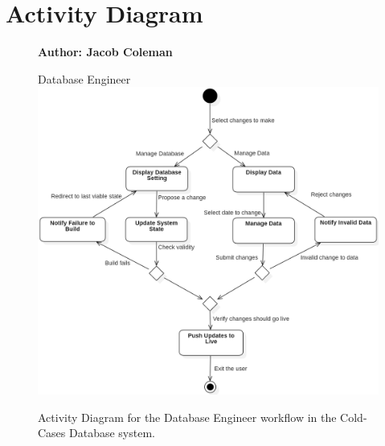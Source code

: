 \documentclass[11pt]{article}
\begin{document}
\section*{Activity Diagram}

\begin{figure}[!ht]
\centering
\textbf{Author: Jacob Coleman}
\vspace{1em}

Database Engineer
	\includegraphics[width=.95\textwidth]{./Activity Diagram/activitydiagram_jardee_1}\\
	\caption{Activity Diagram for the Database Engineer workflow in the Cold-Cases Database system.}
	\label{fig:activity_diagram}
\end{figure}
\end{document}
